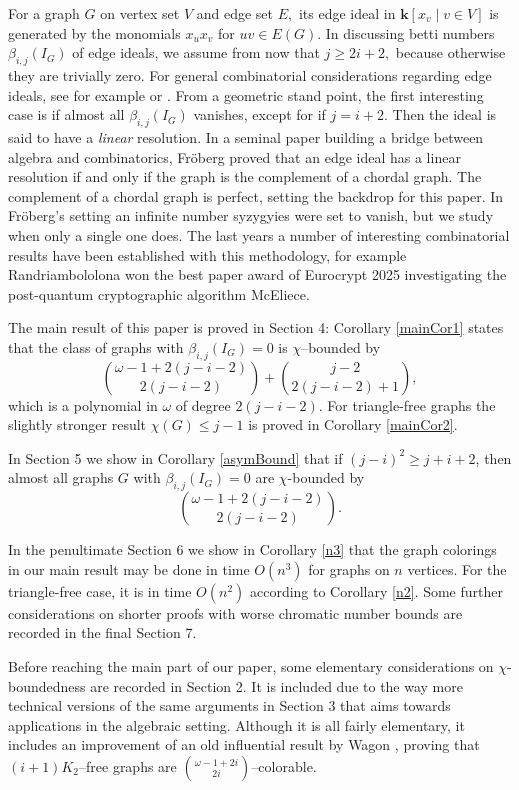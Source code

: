 \documentclass{article}
\theoremstyle{plain}
\theoremstyle{definition}
\begin{document}
For a graph $G$ on vertex set $V$ and edge set $E,$ its edge ideal in $\mathbf{k}[x_v \mid v\in V]$ is generated by the monomials $x_ux_v$ for $uv \in E(G).$
In discussing betti numbers $\beta_{i,j}(I_G)$ of edge ideals, we assume from now that $j\geq 2i+2,$ because otherwise they are trivially zero. For general combinatorial considerations regarding edge ideals, see for example \cite{de} or \cite{EO23}.
From a geometric stand point, the first interesting case is if almost all $\beta_{i,j}(I_G)$ vanishes, except for if $j=i+2.$ Then the ideal is said to have a \emph{linear} resolution. In a seminal paper building a bridge between algebra and combinatorics, Fr\"oberg proved \cite{fro} that an edge ideal has a linear resolution if and only if the graph is the complement of a chordal graph. The complement of a chordal graph is perfect, setting the backdrop for this paper. In Fröberg's setting an infinite number syzygyies were set to vanish, but we study when only a single one does. The last years a number of interesting combinatorial results have been established with this methodology, for example Randriambololona \cite{ran} won the best paper award of Eurocrypt 2025 investigating the post-quantum cryptographic algorithm McEliece.

The main result of this paper is proved in Section 4: Corollary \ref{mainCor1} states that the class of graphs with $ \beta_{i,j}(I_G) = 0$ is $\chi$--bounded by
\[ {\omega-1+2(j-i-2) \choose 2(j-i-2)} +  {j-2 \choose 2(j-i-2)+1}, \] 
which is a polynomial in $\omega$ of degree $2(j-i-2).$ For triangle-free graphs the slightly stronger result  $\chi(G) \leq j-1$ is proved in Corollary \ref{mainCor2}.

In Section 5 we show in Corollary \ref{asymBound} that if $(j-i)^2 \geq j+i+2$, then almost all graphs $G$ with $ \beta_{i,j}(I_G) = 0$ are $\chi$-bounded by
\[ {\omega-1+2(j-i-2) \choose 2(j-i-2)}. \] 

In the penultimate Section 6 we show in Corollary \ref{n3} that the graph colorings in our main result may be done in time $O(n^3)$ for graphs on $n$ vertices. For the triangle-free case, it is in time $O(n^2)$ according to Corollary \ref{n2}. Some further considerations on shorter proofs with worse chromatic number bounds are recorded in the final Section 7.

Before reaching the main part of our paper, some elementary considerations on $\chi$-boundedness are recorded in Section 2. It is  included due to the way more technical versions of the same arguments in Section 3 that aims towards applications in the algebraic setting. Although it is all fairly elementary, it includes an improvement of an old influential result by Wagon \cite{W80}, proving that $(i+1)K_2$--free graphs are ${\omega-1+2i \choose 2i}$--colorable.
\end{document}
